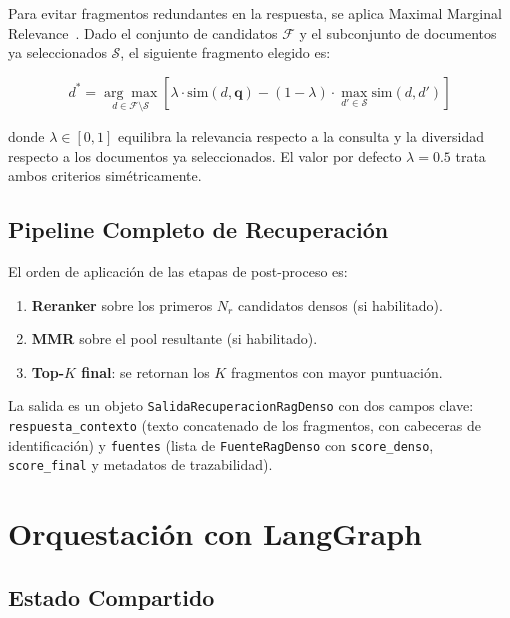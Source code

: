 \documentclass[conference]{IEEEtran}
\newcommand{\code}[1]{\texttt{\small #1}}
\begin{document}
Para evitar fragmentos redundantes en la respuesta, se aplica Maximal Marginal
Relevance~\cite{carbonell1998mmr}. Dado el conjunto de candidatos $\mathcal{F}$
y el subconjunto de documentos ya seleccionados $\mathcal{S}$, el siguiente
fragmento elegido es:

\begin{equation}
d^* = \underset{d \in \mathcal{F} \setminus \mathcal{S}}{\arg\max}
\left[
  \lambda \cdot \mathrm{sim}(d, \mathbf{q})
  - (1-\lambda) \cdot \max_{d' \in \mathcal{S}} \mathrm{sim}(d, d')
\right]
\label{eq:mmr}
\end{equation}

donde $\lambda \in [0,1]$ equilibra la relevancia respecto a la consulta y la
diversidad respecto a los documentos ya seleccionados. El valor por defecto
$\lambda = 0.5$ trata ambos criterios simétricamente.

\subsection{Pipeline Completo de Recuperación}

El orden de aplicación de las etapas de post-proceso es:

\begin{enumerate}
    \item \textbf{Reranker} sobre los primeros $N_r$ candidatos densos (si habilitado).
    \item \textbf{MMR} sobre el pool resultante (si habilitado).
    \item \textbf{Top-$K$ final}: se retornan los $K$ fragmentos con mayor puntuación.
\end{enumerate}

La salida es un objeto \code{SalidaRecuperacionRagDenso} con dos campos clave:
\code{respuesta\_contexto} (texto concatenado de los fragmentos, con cabeceras
de identificación) y \code{fuentes} (lista de \code{FuenteRagDenso} con
\code{score\_denso}, \code{score\_final} y metadatos de trazabilidad).

\section{Orquestación con LangGraph}
\label{sec:langgraph}

\subsection{Estado Compartido}
\end{document}
